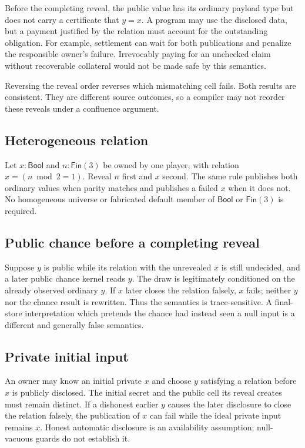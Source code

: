 \documentclass[11pt]{article}
\begin{document}
Before the completing reveal, the public value has its ordinary payload type
but does not carry a certificate that $y=x$. A program may use the disclosed data,
but a payment justified by the relation must account for the outstanding
obligation. For example, settlement can wait for both publications and
penalize the responsible owner's failure. Irrevocably paying for an unchecked
claim without recoverable collateral would not be made safe by this semantics.

Reversing the reveal order reverses which mismatching cell fails.  Both results
are consistent.  They are different source outcomes, so a compiler may not
reorder these reveals under a confluence argument.

\subsection{Heterogeneous relation}

Let $x:\mathsf{Bool}$ and $n:\mathsf{Fin}(3)$ be owned by one player, with
relation $x=(n\bmod 2=1)$.  Reveal $n$ first and $x$ second.  The same rule
publishes both ordinary values when parity matches and publishes a failed $x$
when it does not.  No homogeneous universe or fabricated default member of
$\mathsf{Bool}$ or $\mathsf{Fin}(3)$ is required.

\subsection{Public chance before a completing reveal}

Suppose $y$ is public while its relation with the unrevealed $x$ is still
undecided, and a later public chance kernel reads $y$.  The draw is legitimately conditioned
on the already observed ordinary $y$.  If $x$ later closes the relation falsely,
$x$ fails; neither $y$ nor the chance result is rewritten.  Thus the semantics
is trace-sensitive.  A final-store interpretation which pretends the chance
had instead seen a null input is a different and generally false semantics.

\subsection{Private initial input}

An owner may know an initial private $x$ and choose $y$ satisfying a relation
before $x$ is publicly disclosed.  The initial secret and the public cell its
reveal creates must remain distinct.  If a dishonest earlier $y$ causes the later disclosure
to close the relation falsely, the publication of $x$ can fail while the ideal
private input remains $x$.  Honest automatic disclosure is an availability
assumption; null-vacuous guards do not establish it.
\end{document}
